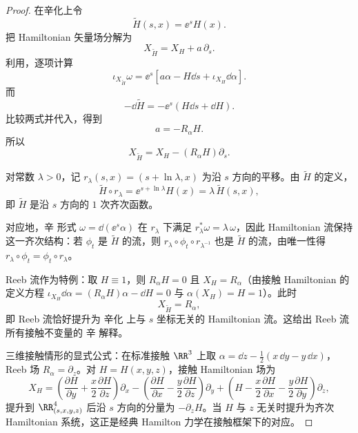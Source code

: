 \begin{proof}
在辛化上令
\[
\widetilde H(s,x)=\ee^sH(x).
\]
把 Hamiltonian 矢量场分解为
\[
X_{\widetilde H}=X_H+a\,\partial_s.
\]
利用，逐项计算
\[
\iota_{X_{\widetilde H}}\omega
=\ee^s\left[
a\alpha-H\dd s+\iota_{X_H}\dd\alpha
\right].
\]
而
\[
-\dd\widetilde H
=-\ee^s(H\dd s+\dd H).
\]
比较两式并代入，得到
\[
a=-R_\alpha H.
\]
所以
\begin{equation}
\boxed{
X_{\widetilde H}
=X_H-(R_\alpha H)\partial_s.
}
\label{eq:math-dg-contact-hamiltonian-lift}
\end{equation}

对常数 $\lambda>0$，记 $r_\lambda(s,x)=(s+\ln\lambda,x)$ 为沿 $s$ 方向的平移。由 $\widetilde H$ 的定义，
\begin{equation*}
\widetilde H\circ r_\lambda
=\ee^{s+\ln\lambda}H(x)
=\lambda\,\widetilde H(s,x),
\end{equation*}
即 $\widetilde H$ 是沿 $s$ 方向的 $1$ 次齐次函数。

对应地，辛 形式 $\omega=\dd(\ee^s\alpha)$ 在 $r_\lambda$ 下满足 $r_\lambda^*\omega=\lambda\,\omega$，因此 Hamiltonian 流保持这一齐次结构：若 $\phi_t$ 是 $\widetilde H$ 的流，则 $r_\lambda\circ\phi_t\circ r_{\lambda^{-1}}$ 也是 $\widetilde H$ 的流，由唯一性得 $r_\lambda\circ\phi_t=\phi_t\circ r_\lambda$。

Reeb 流作为特例：取 $H\equiv1$，则 $R_\alpha H=0$ 且 $X_H=R_\alpha$（由接触 Hamiltonian 的定义方程 $\iota_{X_H}\dd\alpha=(R_\alpha H)\alpha-\dd H=0$ 与 $\alpha(X_H)=H=1$）。此时
\begin{equation*}
X_{\widetilde H}=R_\alpha,
\end{equation*}
即 Reeb 流恰好提升为 辛化 上与 $s$ 坐标无关的 Hamiltonian 流。这给出 Reeb 流所有接触不变量的 辛 解释。

三维接触情形的显式公式：在标准接触 $\RR^3$ 上取 $\alpha=\dd z-\tfrac12(x\,\dd y-y\,\dd x)$，Reeb 场 $R_\alpha=\partial_z$。对 $H=H(x,y,z)$，接触 Hamiltonian 场为
\begin{equation*}
X_H
=\left(\frac{\partial H}{\partial y}+\frac{x}{2}\frac{\partial H}{\partial z}\right)\partial_x
-\left(\frac{\partial H}{\partial x}-\frac{y}{2}\frac{\partial H}{\partial z}\right)\partial_y
+\left(H-\frac{x}{2}\frac{\partial H}{\partial x}-\frac{y}{2}\frac{\partial H}{\partial y}\right)\partial_z,
\end{equation*}
提升到 $\RR^4_{(s,x,y,z)}$ 后沿 $s$ 方向的分量为 $-\partial_z H$。当 $H$ 与 $z$ 无关时提升为齐次 Hamiltonian 系统，这正是经典 Hamilton 力学在接触框架下的对应。


\end{proof}
